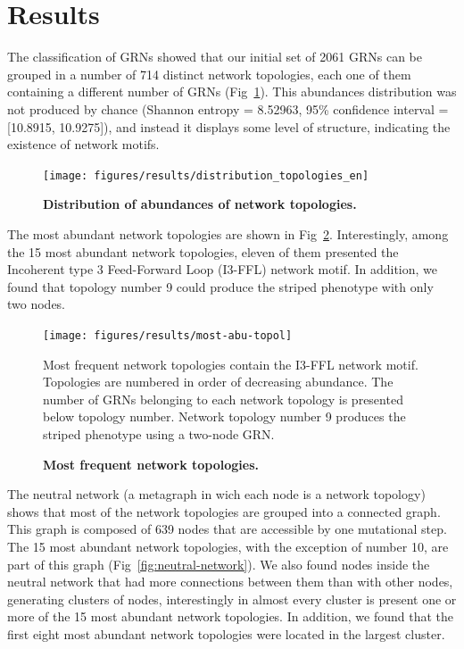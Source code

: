 \documentclass[10pt,letterpaper]{article}
\begin{document}
\section*{Results}

The classification of GRNs showed that our initial set of 2061 GRNs can be 
grouped in a number of 714 distinct network topologies, each one of them
containing a different number of GRNs (Fig~\ref{fig:distopol}). This abundances
distribution was not produced by chance (Shannon entropy = 8.52963, 95\%
confidence interval = [10.8915, 10.9275]), and instead it displays some level 
of structure, indicating the existence of network motifs.

\begin{figure}[!h]
 \center
 \texttt{[image: figures/results/distribution\_topologies\_en]}
 \caption{\bf Distribution of abundances of network topologies.}
 \label{fig:distopol}
\end{figure}

The most abundant network topologies are shown in Fig~\ref{fig:topol}. 
Interestingly, among the 15 most abundant network topologies, eleven of them 
presented the Incoherent type 3 Feed-Forward Loop (I3-FFL) network motif. In 
addition, we found that topology number 9 could produce the striped phenotype 
with only two nodes.

\begin{figure}[!h]
 \texttt{[image: figures/results/most-abu-topol]}
 \caption{\bf Most frequent network topologies.}
 Most frequent network topologies contain the I3-FFL network motif. Topologies 
 are numbered in order of decreasing abundance.
 The number of GRNs belonging to each network topology is presented below 
 topology number.
 Network topology number 9 produces the striped phenotype using a two-node GRN.
 \label{fig:topol}
\end{figure}

The neutral network (a metagraph in wich each node is a network topology) 
shows that most of the network topologies are grouped into a connected graph.
This graph is composed of 639 nodes that are accessible by one mutational step.
The 15 most abundant network topologies, with the exception of 
number 10, are part of this graph (Fig~\ref{fig:neutral-network}). We also 
found nodes inside the neutral network that had more connections between them 
than with other nodes, generating clusters of nodes, interestingly in 
almost every cluster is present one or more of the 15 most abundant network 
topologies. In addition, we found that the first eight most abundant network 
topologies were located in the largest cluster.
\end{document}
